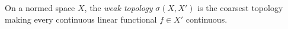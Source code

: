 
On a normed space $X$, the \emph{weak topology} $\sigma(X,X')$ is the coarsest topology making every continuous linear functional $f\in X'$ continuous.

